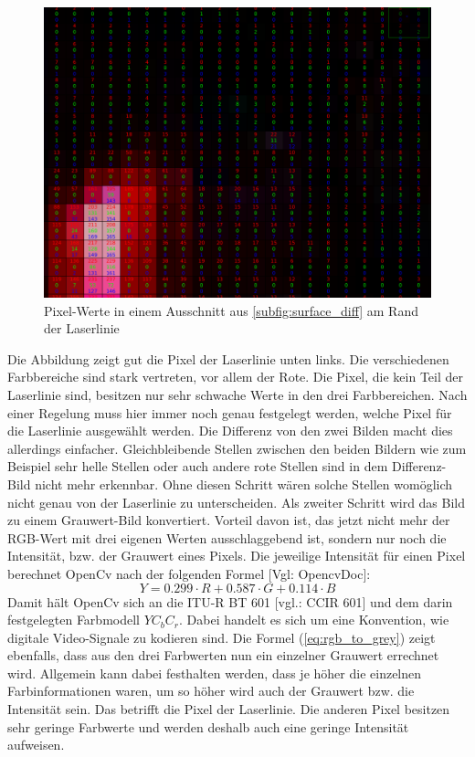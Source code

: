 	\begin{figure}[h]
		\centering
		\includegraphics[width=0.75\linewidth]{img/hauptteil/bildverarbeitung/pixel_values.png}
		\caption{Pixel-Werte in einem Ausschnitt aus \ref{subfig:surface_diff} am Rand der Laserlinie}
		\label{fig:pix_values}
	\end{figure} 
	
	Die Abbildung zeigt gut die Pixel der Laserlinie unten links. Die verschiedenen Farbbereiche sind stark vertreten, vor allem der Rote. Die Pixel, die kein Teil der Laserlinie sind, besitzen nur sehr schwache Werte in den drei Farbbereichen. Nach einer Regelung muss hier immer noch genau festgelegt werden, welche Pixel für die Laserlinie ausgewählt werden. Die Differenz von den zwei Bilden macht dies allerdings einfacher. Gleichbleibende Stellen zwischen den beiden Bildern wie zum Beispiel sehr helle Stellen oder auch andere rote Stellen sind in dem Differenz-Bild nicht mehr erkennbar. Ohne diesen Schritt wären solche Stellen womöglich nicht genau von der Laserlinie zu unterscheiden. \newline
	Als zweiter Schritt wird das Bild zu einem Grauwert-Bild konvertiert. Vorteil davon ist, das jetzt nicht mehr der RGB-Wert mit drei eigenen Werten ausschlaggebend ist, sondern nur noch die Intensität, bzw. der Grauwert eines Pixels. Die jeweilige Intensität für einen Pixel berechnet OpenCv nach der folgenden Formel [Vgl: OpencvDoc]:
	\begin{equation}
	Y = 0.299 \cdot R + 0.587 \cdot G + 0.114 \cdot B
	\label{eq:rgb_to_grey}
	\end{equation}
	Damit hält OpenCv sich an die ITU-R BT 601 [vgl.: CCIR 601] und dem darin festgelegten Farbmodell \( YC_bC_r \). Dabei handelt es sich um eine Konvention, wie digitale Video-Signale zu kodieren sind. \newline
	Die Formel (\ref{eq:rgb_to_grey}) zeigt ebenfalls, dass aus den drei Farbwerten nun ein einzelner Grauwert errechnet wird. Allgemein kann dabei festhalten werden, dass je höher die einzelnen Farbinformationen waren, um so höher wird auch der Grauwert bzw. die Intensität sein. Das betrifft die Pixel der Laserlinie. Die anderen Pixel besitzen sehr geringe Farbwerte und werden deshalb auch eine geringe Intensität aufweisen. 
	
